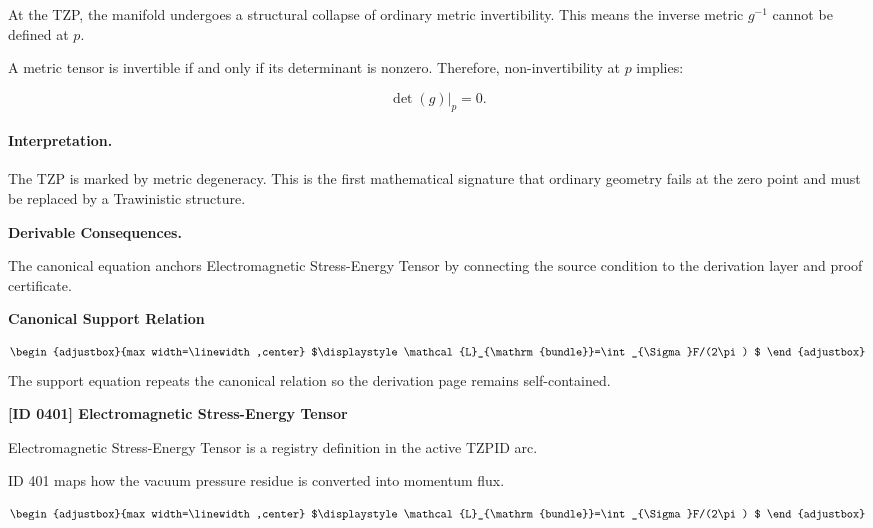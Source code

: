 At the TZP, the manifold undergoes a structural collapse of ordinary metric invertibility. This means the inverse metric $g^{-1}$ cannot be defined at $p$.

A metric tensor is invertible if and only if its determinant is nonzero. Therefore, non-invertibility at $p$ implies:

\begin{equation}
\det(g)\big|_{p}=0 .
\end{equation}

\paragraph{Interpretation.}
The TZP is marked by metric degeneracy. This is the first mathematical signature that ordinary geometry fails at the zero point and must be replaced by a Trawinistic structure.

\par\vspace{0.35em}
\noindent\textbf{Derivable Consequences.}\quad
\begingroup
\footnotesize
\raggedright
The canonical equation anchors Electromagnetic Stress-Energy Tensor by connecting the source condition to the derivation layer and proof certificate.
\par\endgroup

\noindent\textbf{Canonical Support Relation}\par
\[
\begin{adjustbox}{max width=\linewidth,center}
$\displaystyle
\mathcal{L}_{\mathrm{bundle}}=\int_{\Sigma}F/(2\pi)
$
\end{adjustbox}
\]
\noindent The support equation repeats the canonical relation so the derivation page remains self-contained.\par

\clearpage
\noindent\textbf{[ID 0401] Electromagnetic Stress-Energy Tensor}\par
\vspace{0.35em}
\begingroup\small
{}
Electromagnetic Stress-Energy Tensor is a registry definition in the active TZPID arc.

ID 401 maps how the vacuum pressure residue is converted into momentum flux.

\[
\begin{adjustbox}{max width=\linewidth,center}
$\displaystyle
\mathcal{L}_{\mathrm{bundle}}=\int_{\Sigma}F/(2\pi)
$
\end{adjustbox}
\]


